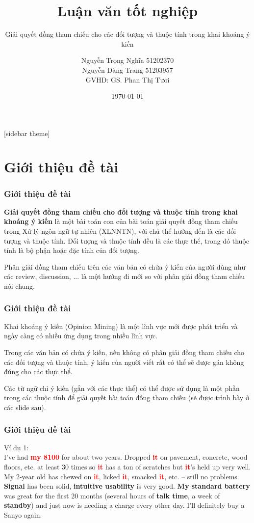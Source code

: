 \documentclass{beamer}
\title{Luận văn tốt nghiệp}
\subtitle{Giải quyết đồng tham chiếu cho các đối tượng và thuộc tính trong khai khoáng ý kiến}
\author[]{Nguyễn Trọng Nghĩa 51202370 \\ Nguyễn Đăng Trang 51203957 \\ GVHD: GS. Phan Thị Tươi}
\institute{Đại học Bách Khoa TP. Hồ Chí Minh}
\date{\today}
\begin{document}
[sidebar theme]
\begin{frame}
\titlepage
\end{frame}

\section{Giới thiệu đề tài}
\begin{frame}
\frametitle{Giới thiệu đề tài}
\begin{block}{}
\textbf{Giải quyết đồng tham chiếu cho đối tượng và thuộc tính trong khai khoáng ý kiến} là một bài toán con của bài toán giải quyết đồng tham chiếu trong Xử lý ngôn ngữ tự nhiên (XLNNTN), với chủ thể hướng đến là các đối tượng và thuộc tính. Đối tượng và thuộc tính đều là các thực thể, trong đó thuộc tính là bộ phận hoặc đặc tính của đối tượng.
\end{block}
\begin{block}{}
Phân giải đồng tham chiếu trên các văn bản có chứa ý kiến của người dùng như các review, discussion, ... là một hướng đi mới so với phân giải đồng tham chiếu nói chung.
\end{block}
\end{frame}

\begin{frame}
\frametitle{Giới thiệu đề tài}
\begin{block}{}
Khai khoáng ý kiến (Opinion Mining) là một lĩnh vực mới được phát triển và ngày càng có nhiều ứng dụng trong nhiều lĩnh vực.
\end{block}
\begin{block}{}
Trong các văn bản có chứa ý kiến, nếu không có phân giải đồng tham chiếu cho các đối tượng và thuộc tính, ý kiến của người viết rất có thể sẽ được gán không đúng cho các thực thể.
\end{block}
\begin{block}{}
Các từ ngữ chỉ ý kiến (gắn với các thực thể) có thể được sử dụng là một phần trong các thuộc tính để giải quyết bài toán đồng tham chiếu (sẽ được trình bày ở các slide sau).
\end{block}
\end{frame}

\begin{frame}
\frametitle{Giới thiệu đề tài}
\begin{block}{}
Ví dụ 1: \\
I've had \textbf{\textcolor{red}{my 8100}} for about two years.  Dropped \textbf{\textcolor{red}{it}} on pavement, concrete, wood floors, etc. at least 30 times so \textbf{\textcolor{red}{it}} has a ton of scratches but \textbf{\textcolor{red}{it}}'s held up very well.  My 2-year old has chewed on \textbf{\textcolor{red}{it}}, licked \textbf{\textcolor{red}{it}}, smacked \textbf{\textcolor{red}{it}}, etc. -- still no problems.  \textbf{Signal} has been solid, \textbf{intuitive usability} is very good.  \textbf{My standard battery} was great for the first 20 months (several hours of \textbf{talk time}, a week of \textbf{standby}) and just now is needing a charge every other day. I'll definitely buy a Sanyo again.
\end{block}
\end{frame}
\end{document}

